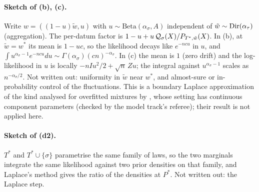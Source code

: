 \paragraph{Sketch of (b), (c).} Write $w=((1-u)\tilde w,u)$ with $u\sim\mathrm{Beta}(\alpha_\sigma,A)$ independent of $\tilde w\sim\mathrm{Dir}(\alpha_\tau)$ (aggregation). The per-datum factor is $1-u+u\,\mathcal{Q}_\sigma(X)/P_{T^*,\tilde w}(X)$. In (b), at $\tilde w=w^*$ its mean is $1-uc$, so the likelihood decays like $e^{-ncu}$ in $u$, and $\int u^{\alpha_\sigma-1}e^{-ncu}du\sim\Gamma(\alpha_\sigma)(cn)^{-\alpha_\sigma}$. In (c) the mean is $1$ (zero drift) and the log-likelihood in $u$ is locally $-nIu^2/2+\sqrt n\,Zu$; the integral against $u^{\alpha_\sigma-1}$ scales as $n^{-\alpha_\sigma/2}$. Not written out: uniformity in $\tilde w$ near $w^*$, and almost-sure or in-probability control of the fluctuations. This is a boundary Laplace approximation of the kind analysed for overfitted mixtures by \citet{rousseau2011asymptotic}, whose setting has continuous component parameters (checked by the model track's referee); their result is not applied here.

\paragraph{Sketch of (d2).} $T^*$ and $T^*\cup\{\sigma\}$ parametrise the same family of laws, so the two marginals integrate the same likelihood against two prior densities on that family, and Laplace's method gives the ratio of the densities at $P^*$. Not written out: the Laplace step.

